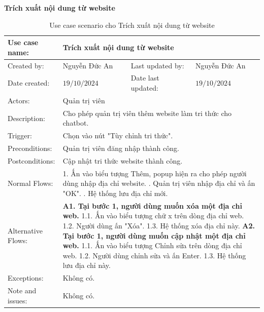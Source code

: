 \textbf{Trích xuất nội dung từ website}
\begin{table}[H]
	\centering
	\begin{tabular}{|l|l|l|l|} 
		\hline Use case name: & \multicolumn{3}{|l|}{Trích xuất nội dung từ website} \\ 
		\hline Created by: & Nguyễn Đức An & Last updated by: & Nguyễn Đức An \\ 
		\hline Date created: & $19 / 10 / 2024$ & Date last updated: & $19 / 10 / 2024$\\ 
		\hline Actors: & \multicolumn{3}{|l|}{ Quản trị viên } \\ 
		\hline Description: & \multicolumn{3}{|p{12cm}|}{ Cho phép quản trị viên thêm website làm tri thức cho chatbot. } \\ 
		\hline Trigger: & \multicolumn{3}{|p{12cm}|}{ Chọn vào nút "Tùy chỉnh tri thức". } \\ 
		\hline Preconditions: & \multicolumn{3}{|p{12cm}|}{ 
			Quản trị viên đăng nhập thành công. 
		} \\ 
		\hline Postconditions: & \multicolumn{3}{|p{12cm}|}{ 
			Cập nhật tri thức website thành công. 
		} \\ 
		\hline Normal Flows: & \multicolumn{3}{|p{12cm}|}{ 
			1. Ấn vào biểu tượng Thêm, popup hiện ra cho phép người dùng nhập địa chỉ website. \newline 
			2. Quản trị viên nhập địa chỉ và ấn "OK". \newline 
			3. Hệ thống lưu địa chỉ mới. 
		} \\ 
		\hline Alternative Flows: & \multicolumn{3}{|p{12cm}|}{ 
			\textbf{A1. Tại bước 1, người dùng muốn xóa một địa chỉ web.} \newline 
			\hspace{0.5cm}1.1. Ấn vào biểu tượng chữ x trên dòng địa chỉ web. \newline 
			\hspace{0.5cm}1.2. Người dùng ấn "Xóa". \newline 
			\hspace{0.5cm}1.3. Hệ thống xóa địa chỉ này. \newline 
			\textbf{A2. Tại bước 1, người dùng muốn cập nhật một địa chỉ web. }\newline 
			\hspace{0.5cm}1.1. Ấn vào biểu tượng Chỉnh sửa trên dòng địa chỉ web. \newline 
			\hspace{0.5cm}1.2. Người dùng chỉnh sửa và ấn Enter. \newline 
			\hspace{0.5cm}1.3. Hệ thống lưu địa chỉ này. 
		} \\ 
		\hline Exceptions: & \multicolumn{3}{|p{12cm}|}{ Không có. } \\ 
		\hline Note and issues: & \multicolumn{3}{|p{12cm}|}{ Không có. } \\ 
		\hline
	\end{tabular}
	\caption{Use case scenario cho Trích xuất nội dung từ website}
\end{table}

